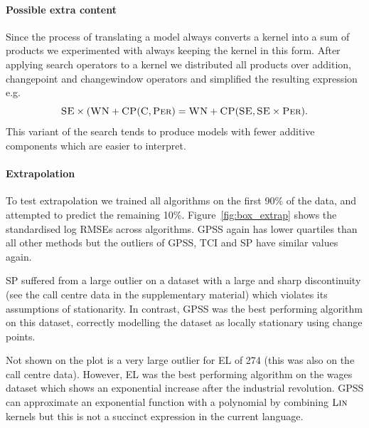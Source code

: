 \documentclass{article}
\def\eg{e.g.\ }
\begin{document}
\paragraph{Possible extra content}


Since the process of translating a model always converts a kernel into a sum of products we experimented with always keeping the kernel in this form.
After applying search operators to a kernel we distributed all products over addition, changepoint and changewindow operators and simplified the resulting expression \eg
\begin{equation}
{\textsc{SE}} \times ({\textsc{WN}} + {\textsc{CP}}({\textsc{C}}, {\textsc{Per}}) = {\textsc{WN}} + {\textsc{CP}}({\textsc{SE}}, {\textsc{SE}} \times {\textsc{Per}}).
\end{equation}
This variant of the search tends to produce models with fewer additive components which are easier to interpret.



\paragraph{Extrapolation}

To test extrapolation we trained all algorithms on the first 90\% of the data, and attempted to predict the remaining 10\%.
Figure~\ref{fig:box_extrap} shows the standardised log RMSEs across algorithms.
GPSS again has lower quartiles than all other methods but the outliers of GPSS, TCI and SP have similar values again.



SP suffered from a large outlier on a dataset with a large and sharp discontinuity (see the call centre data in the supplementary material) which violates its assumptions of stationarity.
In contrast, GPSS was the best performing algorithm on this dataset, correctly modelling the dataset as locally stationary using change points.

Not shown on the plot is a very large outlier for EL of 274 (this was also on the call centre data).
However, EL was the best performing algorithm on the wages dataset which shows an exponential increase after the industrial revolution.
GPSS can approximate an exponential function with a polynomial by combining ${\textsc{Lin}}$ kernels but this is not a succinct expression in the current language.
\end{document}

